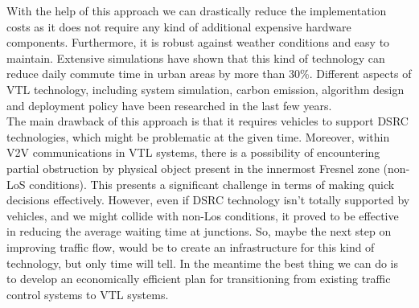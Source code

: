 \documentclass[17pt]{report}
\begin{document}
\indent \indent
With the help of this approach we can drastically reduce
the implementation costs as it does not require any kind of additional
expensive hardware components. Furthermore, it is robust against weather conditions
and easy to maintain. Extensive simulations have shown that this kind
of technology can reduce daily commute time in urban areas by more than 30\%.
Different aspects of VTL technology, including system simulation, carbon
emission, algorithm design and deployment policy have been researched in the
last few years. \cite{Neudecker2012}\\
\indent \indent
The main drawback of this approach is that it requires vehicles
to support DSRC technologies, which might be problematic at the given time.
Moreover, within V2V communications in VTL systems, there is a possibility of
encountering partial obstruction by physical object present in the innermost
Fresnel zone (non-LoS conditions). This presents a significant challenge in terms
of making quick decisions effectively. However, even if DSRC
technology isn't totally supported by vehicles, and we might collide with non-Los
conditions, it proved to be effective in reducing the average waiting time at
junctions. So, maybe the next step on improving traffic flow, would be to create
an infrastructure for this kind of technology, but only time will tell. In the meantime
the best thing we can do is to develop an economically efficient plan for
transitioning from existing traffic control systems to  VTL systems.

\pagebreak
\end{document}
